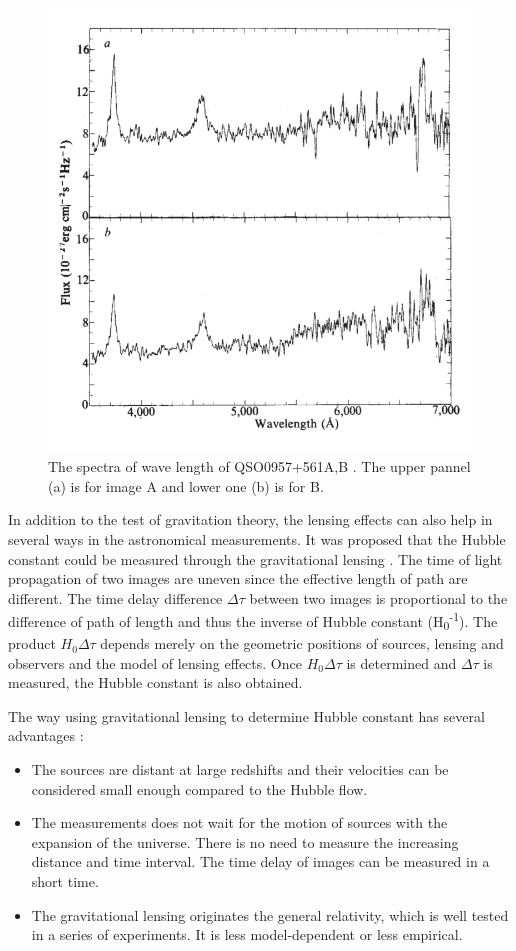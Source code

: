 \documentclass[letter,12pt]{article}
\begin{document}
\begin{figure}[htbp]
\centering
\includegraphics[width=.9\linewidth]{./figures/QuasarsAB.png}
\caption{\label{fig:orgd1d859c}The spectra of wave length of QSO0957+561A,B \citep{Walsh:1979nx}. The upper pannel (a) is for image A and lower one (b) is for B.}
\end{figure}

In addition to the test of gravitation theory, the lensing effects
can also help in several ways in the astronomical measurements. It
was proposed that the Hubble constant could be measured through the
gravitational lensing \citep{1964MNRAS128307R}. The time of light
propagation of two images are uneven since the effective length of
path are different. The time delay difference \(\Delta \tau\) between two
images is proportional to the difference of path of length and thus
the inverse of Hubble constant (H\textsubscript{0}\textsuperscript{-1}). The product
\(H_0\Delta\tau\) depends merely on the geometric positions of
sources, lensing and observers and the model of lensing
effects. Once \(H_0\Delta\tau\) is determined and \(\Delta \tau\) is
measured, the Hubble constant is also obtained.

The way using gravitational lensing to determine Hubble constant has
several advantages \citep{narayanlectures1997}:
\begin{itemize}
\item The sources are distant at large redshifts and their velocities
can be considered small enough compared to the Hubble flow.
\item The measurements does not wait for the motion of sources with the
expansion of the universe. There is no need to measure the
increasing distance and time interval. The time delay of images
can be measured in a short time.
\item The gravitational lensing originates the general relativity, which
is well tested in a series of experiments. It is less
model-dependent or less empirical.
\end{itemize}
\end{document}
